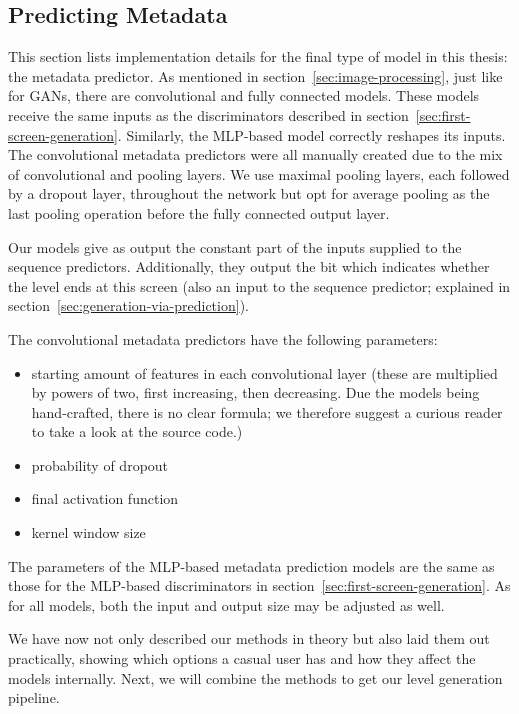\subsection{Predicting Metadata}

This section lists implementation details for the final type of model
in this thesis: the metadata predictor. As mentioned in
section~\ref{sec:image-processing}, just like for GANs, there are
convolutional and fully connected models. These models receive the
same inputs as the discriminators described in
section~\ref{sec:first-screen-generation}. Similarly, the MLP-based
model correctly reshapes its inputs. \\
The convolutional metadata predictors were all manually created due to
the mix of convolutional and pooling layers. We use maximal pooling
layers, each followed by a dropout layer, throughout the network but
opt for average pooling as the last pooling operation before the fully
connected output layer.

Our models give as output the constant part of the inputs supplied to
the sequence predictors. Additionally, they output the bit which
indicates whether the level ends at this screen (also an input to the
sequence predictor; explained in
section~\ref{sec:generation-via-prediction}).

The convolutional metadata predictors have the following parameters:
\begin{itemize}
\item starting amount of features in each convolutional layer (these
  are multiplied by powers of two, first increasing, then decreasing.
  Due the models being hand-crafted, there is no clear formula; we
  therefore suggest a curious reader to take a look at the source
  code.)
\item probability of dropout
\item final activation function
\item kernel window size
\end{itemize}
The parameters of the MLP-based metadata prediction models are the
same as those for the MLP-based discriminators in
section~\ref{sec:first-screen-generation}.
As for all models, both the input and output size may be adjusted as well.

We have now not only described our methods in theory but also laid
them out practically, showing which options a casual user has and how
they affect the models internally. Next, we will combine the methods
to get our level generation pipeline.



